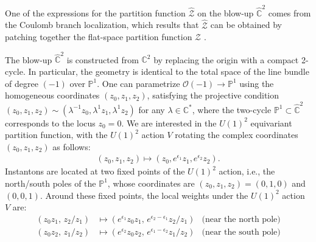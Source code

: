\documentclass[letterpaper, 11pt]{article}
\def\IC{\mathbb{C}}
\def\IP{\mathbb{P}}
\def\e{\epsilon}
\begin{document}
One of the expressions for the partition function $\hat{\mathcal{Z}}$ on the blow-up $\hat{\IC}^2$ comes from the Coulomb branch localization, which results that $\hat{\mathcal{Z}}$ can be obtained by patching together the flat-space partition function $\mathcal Z$ \cite{Nekrasov:2003vi}.

The blow-up $\hat{\IC}^2$ is constructed from $\IC^2$ by replacing the origin with a compact 2-cycle. In particular, the geometry is identical to the total space of the line bundle of degree $(-1)$ over $\IP^1$. One can parametrize $\mathcal{O}(-1)\rightarrow \IP^1$ using the homogeneous coordinates $(z_0, z_1, z_2)$, satisfying the projective condition $(z_0, z_1, z_2) \sim (\lambda^{-1}z_0, \lambda^1 z_1, \lambda^1 z_2)$ for any $\lambda \in \IC^*$, where the two-cycle  $\IP^1 \subset \hat{\IC}^2$ corresponds to the locus $z_0 = 0$. 
We are interested in the $U(1)^2$ equivariant partition function, with the $U(1)^2$ action $V$ rotating the complex coordinates $(z_0, z_1, z_2)$ as follows:
\begin{align}
  (z_0, z_1, z_2) \mapsto (z_0, e^{\e_1}z_1, e^{\e_2}z_2).
\end{align}
Instantons are located at two fixed points of the $U(1)^2$ action, i.e., the north/south poles of the $\mathbb{P}^1$, whose coordinates are 
$(z_0, z_1, z_2)  = (0,1,0)$ and $(0,0,1)$. Around these fixed points, the local weights under the $U(1)^2$ action $V$ are:
\begin{align}
  (z_0 z_1,\,z_2/z_1) &\mapsto  (e^{\e_1}z_0 z_1, \,e^{\e_2 - \e_1}z_2/z_1) &  \text{(near the north pole)}\\
  (z_0 z_2,\,z_1/z_2) &\mapsto (e^{\e_2}z_0 z_2, \,e^{\e_1 - \e_2}z_1/z_2) &  \text{(near the south pole)}
\end{align}
\end{document}
